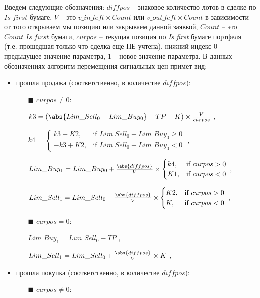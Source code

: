 Введем следующие обозначения: $diffpos$ -- знаковое количество лотов в сделке по $Is \; first$ бумаге, $V$ -- это $v\_in\_left \times Count$ или
$v\_out\_left \times Count$ в зависимости от того открываем мы позицию или закрываем данной заявкой, $Count$ -- это $Count$ $Is \; first$ бумаги,
$curpos$ -- текущая позиция по \textit{Is first} бумаге портфеля (т.е. прошедшая только что сделка еще НЕ учтена), нижний индекс $0$ -- предыдущее значение параметра, $1$ -- новое значение параметра. В данных обозначениях
алгоритм перемещения сигнальных цен примет вид:
\begin{itemize}
\item прошла продажа (соответственно, в количестве $diffpos$):
\begin{itemize}
\item[\scriptsize$\blacksquare$] $curpos \neq 0$:
	
	$k3 = \left(\abs{Lim\_Sell_0 - Lim\_Buy_0} - TP - K \right) \times \frac{V}{curpos}$ ,
	
	$k4 = \begin{cases} k3 + K2, & \mbox{if } Lim\_Sell_0 - Lim\_Buy_0 \geq 0 \\ -k3 + K2, & \mbox{if } Lim\_Sell_0 - Lim\_Buy_0 < 0 \end{cases}$ ,
	
	$Lim\_Buy_1 = Lim\_Buy_0 + \frac{\abs{diffpos}}{V} \times \begin{cases} k4, & \mbox{if } curpos > 0 \\ K1, & \mbox{if } curpos < 0 \end{cases}$ ,
	
	$Lim\_Sell_1 = Lim\_Sell_0 + \frac{\abs{diffpos}}{V} \times \begin{cases} K2, & \mbox{if } curpos > 0 \\ K, & \mbox{if } curpos < 0 \end{cases}$ ,
	
\item[\scriptsize$\blacksquare$] $curpos = 0$:
	
	$Lim\_Buy_1 = Lim\_Sell_0 - TP$ ,
	
	$Lim\_Sell_1 = Lim\_Sell_0 + \frac{\abs{diffpos}}{V} \times K$ ,
	
\end{itemize}
\item прошла покупка (соответственно, в количестве $diffpos$):
\begin{itemize}
\item[\scriptsize$\blacksquare$] $curpos \neq 0$:
	

\end{itemize}
\end{itemize}
